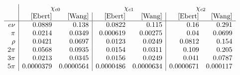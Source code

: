 $$
\begin{array}{r|rr|rr|rr}
  &\multicolumn{2}{c}{\chi_{c0}} & \multicolumn{2}{c}{\chi_{c1}} & \multicolumn{2}{c}{\chi_{c2}} \\
   & \text{[Ebert]} & \text{[Wang]} & \text{[Ebert]} & \text{[Wang]} & \text{[Ebert]} & \text{[Wang]} \\
\hline
 e\nu & 0.0889 & 0.138 & 0.0822 & 0.115 & 0.16 & 0.291 \\
 \pi & 0.0214 & 0.0349 & 0.000619 & 0.00275 & 0.04 & 0.0699 \\
 \rho & 0.0421 & 0.0697 & 0.0123 & 0.0249 & 0.0812 & 0.154 \\
 2\pi & 0.0568 & 0.0935 & 0.0154 & 0.0311 & 0.109 & 0.205 \\
 3\pi & 0.0213 & 0.0345 & 0.0156 & 0.0249 & 0.041 & 0.0787 \\
 5\pi & 0.0000379 & 0.0000564 & 0.0000486 & 0.0000634 & 0.0000671 & 0.000117 \\
\end{array}
$$